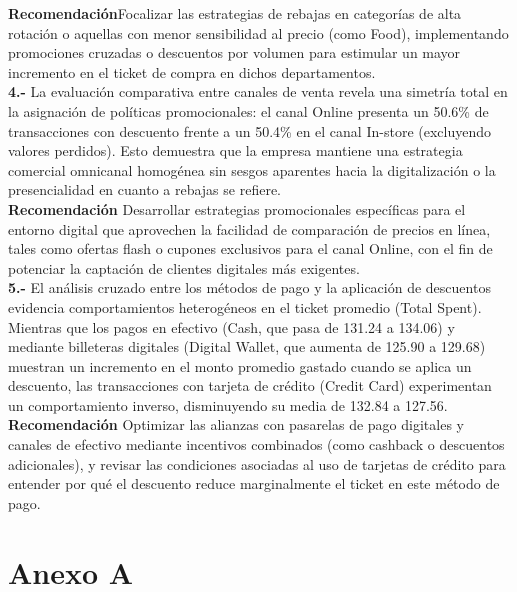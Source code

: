 \documentclass[oneside,11pt]{Latex/Classes/PhDthesisPSnPDF}
\begin{document}
\textbf{Recomendación}Focalizar las estrategias de rebajas en categorías
de alta rotación o aquellas con menor sensibilidad al precio (como
Food), implementando promociones cruzadas o descuentos por volumen para
estimular un mayor incremento en el ticket de compra en dichos
departamentos.\\

\textbf{4.-} La evaluación comparativa entre canales de venta revela una
simetría total en la asignación de políticas promocionales: el canal
Online presenta un 50.6\% de transacciones con descuento frente a un
50.4\% en el canal In-store (excluyendo valores perdidos). Esto
demuestra que la empresa mantiene una estrategia comercial omnicanal
homogénea sin sesgos aparentes hacia la digitalización o la
presencialidad en cuanto a rebajas se refiere.\\

\textbf{Recomendación} Desarrollar estrategias promocionales específicas
para el entorno digital que aprovechen la facilidad de comparación de
precios en línea, tales como ofertas flash o cupones exclusivos para el
canal Online, con el fin de potenciar la captación de clientes digitales
más exigentes.\\

\textbf{5.-} El análisis cruzado entre los métodos de pago y la
aplicación de descuentos evidencia comportamientos heterogéneos en el
ticket promedio (Total Spent). Mientras que los pagos en efectivo (Cash,
que pasa de 131.24 a 134.06) y mediante billeteras digitales (Digital
Wallet, que aumenta de 125.90 a 129.68) muestran un incremento en el
monto promedio gastado cuando se aplica un descuento, las transacciones
con tarjeta de crédito (Credit Card) experimentan un comportamiento
inverso, disminuyendo su media de 132.84 a 127.56.\\

\textbf{Recomendación} Optimizar las alianzas con pasarelas de pago
digitales y canales de efectivo mediante incentivos combinados (como
cashback o descuentos adicionales), y revisar las condiciones asociadas
al uso de tarjetas de crédito para entender por qué el descuento reduce
marginalmente el ticket en este método de pago.\\

\appendix
\renewcommand{\thechapter}{\Alph{chapter}}

\chapter{Anexo A}
\end{document}
